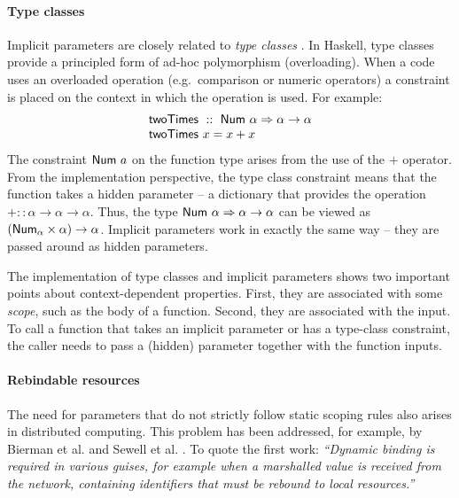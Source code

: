 
\paragraph{Type classes}
Implicit parameters are closely related to \emph{type classes} \cite{app-type-classes}. In Haskell,
type classes provide a principled form of ad-hoc polymorphism (overloading). When a code uses 
an overloaded operation (e.g.~comparison or numeric operators) a constraint is placed on the 
context in which the operation is used. For example:
%
\begin{equation*}
\begin{array}{l}
\textnormal{\sffamily twoTimes}~::~\textnormal{\sffamily Num}~\alpha \Rightarrow \alpha \rightarrow \alpha \\
\textnormal{\sffamily twoTimes}~x=x+x
\end{array}
\end{equation*}
%
The constraint $\textnormal{\sffamily Num}~a$ on the function type arises from the use of the $+$ operator. 
From the implementation perspective, the type class constraint means that the function takes 
a hidden parameter -- a dictionary that provides the operation $+ :: \alpha \rightarrow \alpha \rightarrow \alpha$.
Thus, the type $\textnormal{\sffamily Num}~\alpha \Rightarrow \alpha \rightarrow \alpha$ can be viewed as
$(\textnormal{\sffamily Num}_\alpha \times \alpha) \rightarrow \alpha$. Implicit parameters work in exactly
the same way -- they are passed around as hidden parameters.

The implementation of type classes and implicit parameters shows two important points about 
context-dependent properties. First, they are associated with some \emph{scope}, such as the body
of a function. Second, they are associated with the input. To call a function that takes an 
implicit parameter or has a type-class constraint, the caller needs to pass a (hidden) parameter
together with the function inputs.


\paragraph{Rebindable resources}
The need for parameters that do not strictly follow static scoping rules also arises in distributed
computing. This problem has been addressed, for example, by Bierman et al. and Sewell et al. 
\cite{app-distributed-rebinding,app-distributed-acute}. To quote the first work: \emph{``Dynamic 
binding is required in various guises, for example when a marshalled value is received from the 
network, containing identifiers that must be rebound to local resources.''}

